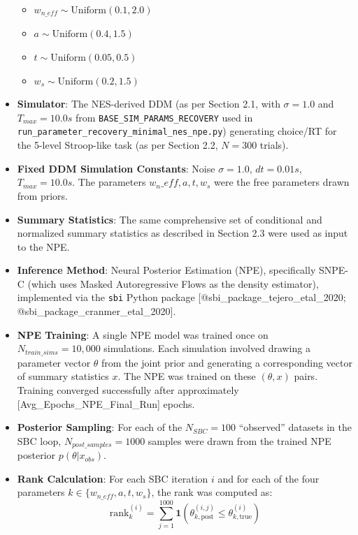 \documentclass[
  11pt,
]{article}
\providecommand{\tightlist}{%
  \setlength{\itemsep}{0pt}\setlength{\parskip}{0pt}}
\begin{document}
\begin{itemize}
  \begin{itemize}
  \tightlist
  \item
    \(w_{n\_eff} \sim \mathrm{Uniform}(0.1, 2.0)\)
  \item
    \(a \sim \mathrm{Uniform}(0.4, 1.5)\)
  \item
    \(t \sim \mathrm{Uniform}(0.05, 0.5)\)
  \item
    \(w_s \sim \mathrm{Uniform}(0.2, 1.5)\)
  \end{itemize}
\item
  \textbf{Simulator}: The NES-derived DDM (as per Section 2.1, with
  \(\sigma=1.0\) and \(T_{max}=10.0s\) from
  \texttt{BASE\_SIM\_PARAMS\_RECOVERY} used in
  \texttt{run\_parameter\_recovery\_minimal\_nes\_npe.py}) generating
  choice/RT for the 5-level Stroop-like task (as per Section 2.2,
  \(N=300\) trials).
\item
  \textbf{Fixed DDM Simulation Constants}: Noise \(\sigma=1.0\),
  \(dt=0.01s\), \(T_{max}=10.0s\). The parameters
  \(w_n\_eff, a, t, w_s\) were the free parameters drawn from priors.
\item
  \textbf{Summary Statistics}: The same comprehensive set of conditional
  and normalized summary statistics as described in Section 2.3 were
  used as input to the NPE.
\item
  \textbf{Inference Method}: Neural Posterior Estimation (NPE),
  specifically SNPE-C (which uses Masked Autoregressive Flows as the
  density estimator), implemented via the \texttt{sbi} Python package
  {[}@sbi\_package\_tejero\_etal\_2020;
  @sbi\_package\_cranmer\_etal\_2020{]}.
\item
  \textbf{NPE Training}: A single NPE model was trained once on
  \(N_{train\_sims} = 10,000\) simulations. Each simulation involved
  drawing a parameter vector \(\theta\) from the joint prior and
  generating a corresponding vector of summary statistics \(x\). The NPE
  was trained on these \((\theta, x)\) pairs. Training converged
  successfully after approximately {[}Avg\_Epochs\_NPE\_Final\_Run{]}
  epochs.
\item
  \textbf{Posterior Sampling}: For each of the \(N_{SBC}=100\)
  ``observed'' datasets in the SBC loop, \(N_{post\_samples}=1000\)
  samples were drawn from the trained NPE posterior
  \(p(\theta|x_{obs})\).
\item
  \textbf{Rank Calculation}: For each SBC iteration \(i\) and for each
  of the four parameters \(k \in \{w_{n\_eff}, a, t, w_s\}\), the rank
  was computed as: \[
  \mathrm{rank}^{(i)}_k = \sum_{j=1}^{1000} \mathbf{1}\left(\theta_{k,\mathrm{post}}^{(i,j)} \leq \theta_{k,\mathrm{true}}^{(i)}\right)
  \]
\end{itemize}
\end{document}
